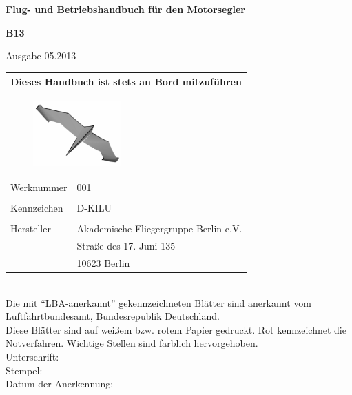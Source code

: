 \documentclass[a5paper,oneside,openany,headings=small]{scrbook}
\begin{document}
\begin{titlepage}
\thispagestyle{empty}
\vspace{2cm}
\begin{center}
\textbf{Flug- und Betriebshandbuch für den Motorsegler}
\end{center}
\begin{center}
\huge{\textbf{B13}}\\
\end{center}
\begin{center}
Ausgabe 05.2013
\end{center}
\begin{center}
\begin{tabular}{|c|}
\hline
Dieses Handbuch ist stets an Bord mitzuführen\\
\hline

\end{tabular}
\end{center}




\begin{figure}[h]
\begin{center}
\includegraphics[width=0.3\textwidth]{charlotte.png}
\end{center}
\end{figure}

\begin{tabular}{l l}
Werknummer & 001\\
 & \\
Kennzeichen & D-KILU\\
 & \\

  Hersteller & Akademische Fliegergruppe Berlin e.V.\\
  & Straße des 17. Juni 135\\
  & 10623 Berlin\\

\end{tabular}\\  
\newline
Die mit "`LBA-anerkannt"' gekennzeichneten Blätter sind anerkannt vom Luftfahrtbundesamt, Bundesrepublik Deutschland.\\
Diese Blätter sind auf weißem bzw. rotem Papier gedruckt. Rot kennzeichnet die Notverfahren. Wichtige Stellen sind farblich hervorgehoben.\\
\newline
Unterschrift:\\
\newline
Stempel:\\
\newline
Datum der Anerkennung:
\end{titlepage}
\newpage
\mbox{} \thispagestyle{empty}
\end{document}
